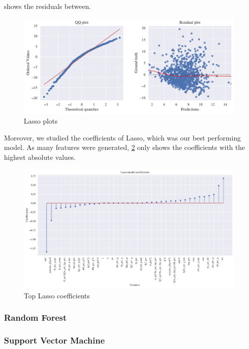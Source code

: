  shows the residuals between.

\begin{figure}[H]
    \centering
    \includegraphics[width=1.0\linewidth]{figures/Lasso_residuals.pdf}
    \caption{Lasso plots}
    \label{fig:lasso-res}
\end{figure}

Moreover, we studied the coefficients of Lasso, which was our best performing model. As many features were generated, \cref{fig:lasso-coeff} only shows the coefficients with the highest absolute values.

\begin{figure}[H]
    \centering
    \includegraphics[width=1.0\linewidth]{figures/Lasso_coeffs.pdf}
    \caption{Top Lasso coefficients}
    \label{fig:lasso-coeff}
\end{figure}
\subsubsection{Random Forest}%
\label{ssub:random-forest}

\subsubsection{Support Vector Machine}%
\label{ssub:support-vector-machine}

